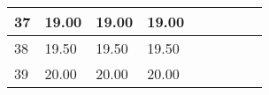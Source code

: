 \begin{longtable}{lllllllrl}
 37 & 19.00                  & 19.00                  & 19.00                  &                                  &                   &                   &                                                                                     &                      \\ \hline
 38 & 19.50                  & 19.50                  & 19.50                  &                                  &                   &                   &                                                                                     &                      \\ \hline
 39 & 20.00                  & 20.00                  & 20.00                  &                                  &                   &                   &                                                                                     &                      \\
\hline
\end{longtable}
